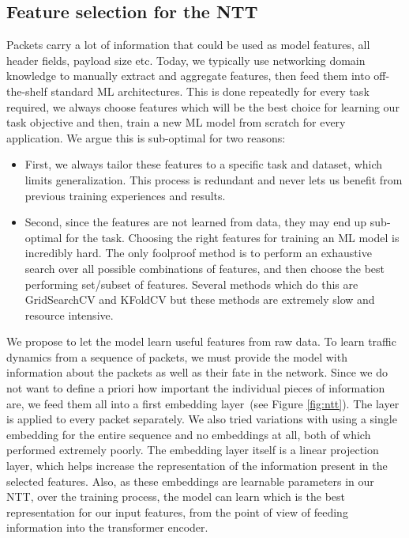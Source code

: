 \subsection{Feature selection for the NTT}
\label{ssec:desfeat}

Packets carry a lot of information that could be used as model features, \eg all header fields, payload size etc. Today, we typically use networking domain knowledge to manually extract and aggregate features, then feed them into off-the-shelf standard ML architectures. This is done repeatedly for every task required, we always choose features which will be the best choice for learning our task objective and then, train a new ML model from scratch for every application.
We argue this is sub-optimal for two reasons:
\begin{itemize}
\item First, we always tailor these features to a specific task and dataset, which limits generalization. This process is redundant and never lets us benefit from previous training experiences and results.
\item Second, since the features are not learned from data, they may end up sub-optimal for the task. Choosing the right features for training an ML model is incredibly hard. The only foolproof method is to perform an exhaustive search over all possible combinations of features, and then choose the best performing set/subset of features. Several methods which do this are GridSearchCV and KFoldCV\cite{scikit-learn} but these methods are extremely slow and resource intensive.
\end{itemize}

We propose to let the model learn useful features from raw data. To learn traffic dynamics from a sequence of packets, we must provide the model with information about the packets as well as their fate in the network. Since we do not want to define a priori how important the individual pieces of information are, we feed them all into a first embedding layer~(see Figure \ref{fig:ntt}). The layer is applied to every packet separately. We also tried variations with using a single embedding for the entire sequence and no embeddings at all, both of which performed extremely poorly. The embedding layer itself is a linear projection layer, which helps increase the representation of the information present in the selected features. Also, as these embeddings are learnable parameters in our NTT, over the training process, the model can learn which is the best representation for our input features, from the point of view of feeding information into the transformer encoder. 

